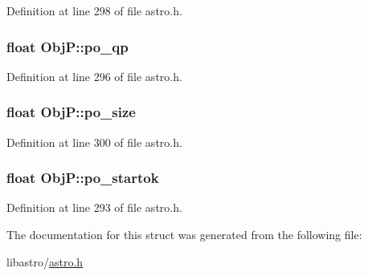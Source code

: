 Definition at line 298 of file astro.\-h.

\hypertarget{struct_obj_p_aa20fa9673689c91ce9da43cff2aa9d97}{
\subsubsection[{po\-\_\-qp}]{\setlength{\rightskip}{0pt plus 5cm}float Obj\-P\-::po\-\_\-qp}}\label{struct_obj_p_aa20fa9673689c91ce9da43cff2aa9d97}


Definition at line 296 of file astro.\-h.

\hypertarget{struct_obj_p_aa7fc26e861e24141508546ae5d1a3d68}{
\subsubsection[{po\-\_\-size}]{\setlength{\rightskip}{0pt plus 5cm}float Obj\-P\-::po\-\_\-size}}\label{struct_obj_p_aa7fc26e861e24141508546ae5d1a3d68}


Definition at line 300 of file astro.\-h.

\hypertarget{struct_obj_p_a0132856d9b24cdbcffda2dc90bcf186d}{
\subsubsection[{po\-\_\-startok}]{\setlength{\rightskip}{0pt plus 5cm}float Obj\-P\-::po\-\_\-startok}}\label{struct_obj_p_a0132856d9b24cdbcffda2dc90bcf186d}


Definition at line 293 of file astro.\-h.



The documentation for this struct was generated from the following file\-:\begin{DoxyCompactItemize}
\item 
libastro/\hyperlink{astro_8h}{astro.\-h}\end{DoxyCompactItemize}
